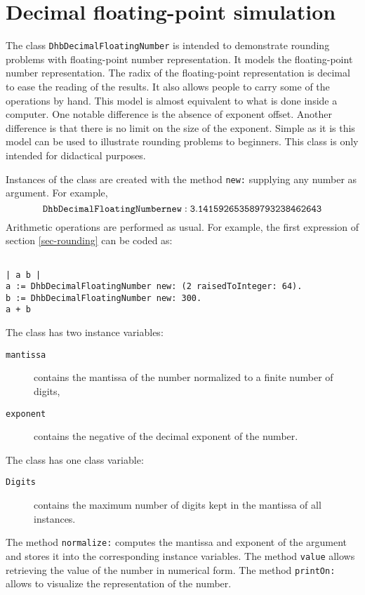\documentclass[twoside]{book}
\begin{document}
\fi

\chapter{Decimal floating-point simulation}
\label{ch-fpSimul} The class {\tt DhbDecimalFloatingNumber} is
intended to demonstrate rounding problems with floating-point
number representation. It models the floating-point number
representation. The radix of the floating-point representation is
decimal to ease the reading of the results. It also allows people
to carry some of the operations by hand. This model is almost
equivalent to what is done inside a computer. One notable
difference is the absence of exponent offset. Another difference
is that there is no limit on the size of the exponent. Simple as
it is this model can be used to illustrate rounding problems to
beginners. This class is only intended for didactical purposes.

Instances of the class are created with the method {\tt new:}
supplying any number as argument. For example, $${\tt
DhbDecimalFloatingNumber new: 3.141592653589793238462643}$$
Arithmetic operations are performed as usual. For example, the
first expression of section \ref{sec-rounding} can be coded as:

\begin{codeExample}
\begin{verbatim}

| a b |
a := DhbDecimalFloatingNumber new: (2 raisedToInteger: 64).
b := DhbDecimalFloatingNumber new: 300.
a + b
\end{verbatim}
\end{codeExample}
The class has two instance variables:
\begin{description}
\item[{\tt mantissa}] contains the mantissa of the number normalized to a finite number of
digits,
\item[{\tt exponent}] contains the negative of the decimal exponent of the number.
\end{description}
The class has one class variable:
\begin{description}
\item[{\tt Digits}] contains the maximum number of digits kept in the mantissa of all instances.
\end{description}
The method {\tt normalize:} computes the mantissa and exponent of
the argument and stores it into the corresponding instance
variables. The method {\tt value} allows retrieving the value of
the number in numerical form. The method {\tt printOn:} allows to
visualize the representation of the number.
\end{document}
